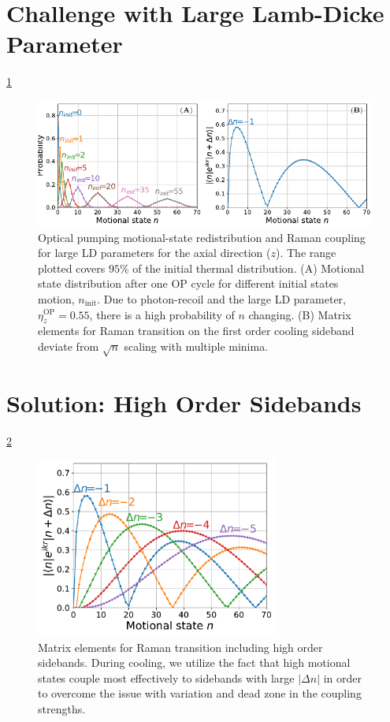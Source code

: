 \section{Challenge with Large Lamb-Dicke Parameter}

\ref{fig:na-rsc-challenges}

\begin{figure}
  \centering
  \includegraphics[width=\textwidth]{figures/na_rsc_challenges.pdf}
  \caption[Optical pumping motional-state redistribution and Raman coupling]{
    Optical pumping motional-state redistribution and Raman coupling for large LD parameters
    for the axial direction ($z$).
    The range plotted covers $95$\% of the initial thermal distribution.
    (A) Motional state distribution after one OP cycle for different initial states motion,
    $n_{\textrm{init}}$.
    Due to photon-recoil and the large LD parameter, $\eta^{\textrm{OP}}_z=0.55$,
    there is a high probability of $n$ changing.
    (B) Matrix elements for Raman transition on the first order cooling sideband
    deviate from $\sqrt{n}$ scaling with multiple minima.
    \label{fig:na-rsc-challenges}}
\end{figure}

\section{Solution: High Order Sidebands}

\ref{fig:na-rsc-mele-raman}

\begin{figure}
  \centering
  \includegraphics[width=8cm]{figures/na_rsc_mele_raman.pdf}
  \caption[Raman coupling including high order sidebands]{
    Matrix elements for Raman transition including high order sidebands.
    During cooling, we utilize the fact that high motional states couple most effectively
    to sidebands with large $|\Delta n|$ in order to overcome the issue with
    variation and dead zone in the coupling strengths.
    \label{fig:na-rsc-mele-raman}}
\end{figure}

